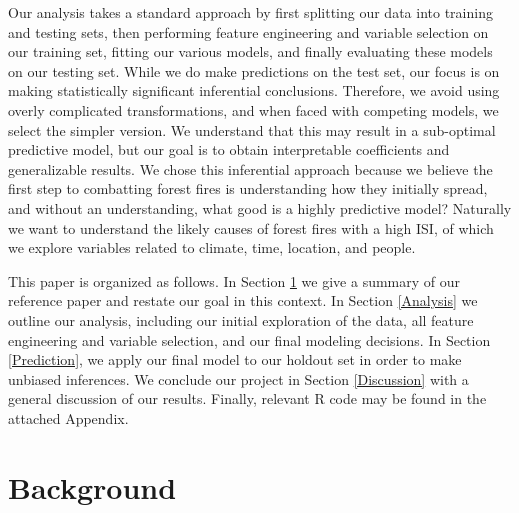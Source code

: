 \documentclass{article}
\begin{document}
Our analysis takes a standard approach by first splitting our data into training and testing sets, then performing feature engineering and variable selection on our training set, fitting our various models, and finally evaluating these models on our testing set. While we do make predictions on the test set, our focus is on making statistically significant inferential conclusions. Therefore, we avoid using overly complicated transformations, and when faced with competing models, we select the simpler version. We understand that this may result in a sub-optimal predictive model, but our goal is to obtain interpretable coefficients and generalizable results. We chose this inferential approach because we believe the first step to combatting forest fires is understanding how they initially spread, and without an understanding, what good is a highly predictive model? Naturally we want to understand the likely causes of forest fires with a high ISI, of which we explore variables related to climate, time, location, and people.

This paper is organized as follows. In Section \ref{Background} we give a summary of our reference paper and restate our goal in this context. In Section \ref{Analysis} we outline our analysis, including our initial exploration of the data, all feature engineering and variable selection, and our final modeling decisions. In Section \ref{Prediction}, we apply our final model to our holdout set in order to make unbiased inferences. We conclude our project in Section \ref{Discussion} with a general discussion of our results. Finally, relevant R code may be found in the attached Appendix.

\section{Background}\label{Background}
\end{document}
